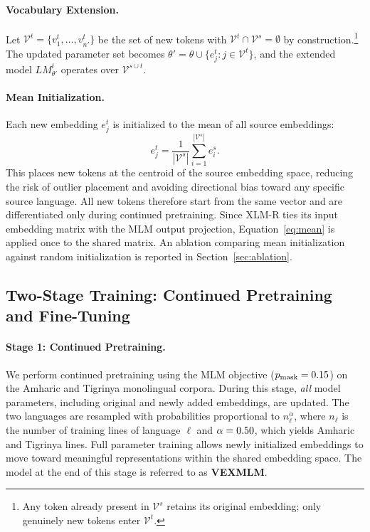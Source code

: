 \paragraph{Vocabulary Extension.} Let $\mathcal{V}^t=\{v^t_1,\ldots,v^t_{n'}\}$ be the set of new tokens with $\mathcal{V}^t\cap\mathcal{V}^s=\emptyset$ by construction.\footnote{Any token already present in $\mathcal{V}^s$ retains its original embedding; only genuinely new tokens enter $\mathcal{V}^t$.} The updated parameter set becomes $\theta'=\theta\cup\{e^t_j: j\in\mathcal{V}^t\}$, and the extended model $LM^t_{\theta'}$ operates over $\mathcal{V}^{s\cup t}$.

\paragraph{Mean Initialization.} Each new embedding $e^t_j$ is initialized to the mean of all source embeddings:
\begin{equation}
e^t_j=\frac{1}{|\mathcal{V}^s|}\sum_{i=1}^{|\mathcal{V}^s|}e^s_i.
\label{eq:mean}
\end{equation}
This places new tokens at the centroid of the source embedding space, reducing the risk of outlier placement and avoiding directional bias toward any specific source language. All new tokens therefore start from the same vector and are differentiated only during continued pretraining. Since XLM-R ties its input embedding matrix with the MLM output projection, Equation~\ref{eq:mean} is applied once to the shared matrix. An ablation comparing mean initialization against random initialization is reported in Section~\ref{sec:ablation}.

\subsection{Two-Stage Training: Continued Pretraining and Fine-Tuning}
\paragraph{Stage 1: Continued Pretraining.} We perform continued pretraining using the MLM objective ($p_{\text{mask}}=0.15$) on the Amharic and Tigrinya monolingual corpora. During this stage, \textit{all} model parameters, including original and newly added embeddings, are updated. The two languages are resampled with probabilities proportional to $n_\ell^{\alpha}$, where $n_\ell$ is the number of training lines of language $\ell$ and $\alpha=0.50$, which yields \ptSampledAmh{} Amharic and \ptSampledTir{} Tigrinya lines. Full parameter training allows newly initialized embeddings to move toward meaningful representations within the shared embedding space. The model at the end of this stage is referred to as \textbf{VEXMLM}.

